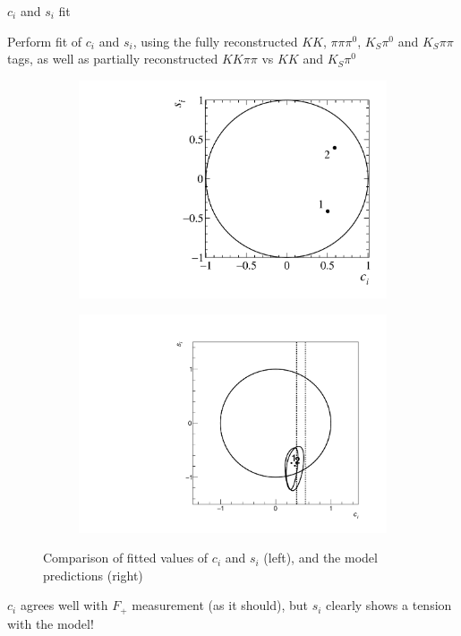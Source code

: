 \documentclass{beamer}
\begin{document}
\begin{frame}{$c_i$ and $s_i$ fit}
  \begin{center}
    Perform fit of $c_i$ and $s_i$, using the fully reconstructed $KK$, $\pi\pi\pi^0$, $K_S\pi^0$ and $K_S\pi\pi$ tags, as well as partially reconstructed $KK\pi\pi$ vs $KK$ and $K_S\pi^0$
  \end{center}
  \vspace{-0.3cm}
  \begin{figure}
    \centering
    \begin{subfigure}{0.4\textwidth}
      \includegraphics[width = 1.0\textwidth]{Plots/StrongPhaseParametersPlot_cisi_2Bins.pdf}
    \end{subfigure}%
    \begin{subfigure}{0.4\textwidth}
      \includegraphics[width = 1.0\textwidth]{Plots/Contours_cisi.pdf}
      \vspace{0.07cm}
    \end{subfigure}
    \vspace{-0.5cm}
    \caption{Comparison of fitted values of $c_i$ and $s_i$ (left), and the model predictions (right)}
  \end{figure}
  \vspace{-0.4cm}
  \begin{center}
    $c_i$ agrees well with $F_+$ measurement (as it should), but $s_i$ clearly shows a tension with the model!
  \end{center}
\end{frame}
\end{document}
